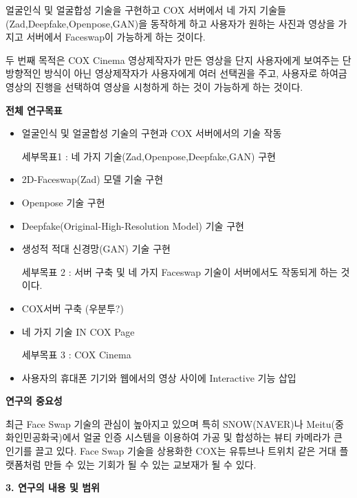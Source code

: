 \documentclass[chapter,oneside]{oblivoir}
\begin{document}
얼굴인식 및 얼굴합성 기술을 구현하고 COX 서버에서 네 가지 기술들(Zad,Deepfake,Openpose,GAN)을 동작하게 하고 사용자가 원하는 사진과 영상을 가지고 서버에서 Faceswap이 가능하게 하는 것이다. 

두 번째 목적은 COX Cinema 영상제작자가 만든 영상을 단지 사용자에게 보여주는 단방향적인 방식이 아닌 영상제작자가 사용자에게 여러 선택권을 주고, 사용자로 하여금 영상의 진행을 선택하여 영상을 시청하게 하는 것이 가능하게 하는 것이다. 

\textbf{전체 연구목표}

\begin{itemize}
    \item 얼굴인식 및 얼굴합성 기술의 구현과 COX 서버에서의 기술 작동

세부목표1 : 네 가지 기술(Zad,Openpose,Deepfake,GAN) 구현

\item 2D-Faceswap(Zad) 모델 기술 구현

\item Openpose 기술 구현

\item Deepfake(Original-High-Resolution Model) 기술 구현 

\item 생성적 적대 신경망(GAN) 기술 구현 

세부목표 2 : 서버 구축 및 네 가지 Faceswap 기술이 서버에서도 작동되게 하는 것이다.

\item COX서버 구축 (우분투?)

\item 네 가지 기술 IN COX Page

세부목표 3 : COX Cinema 

\item 사용자의 휴대폰 기기와 웹에서의 영상 사이에 Interactive 기능 삽입
    
\end{itemize}

\textbf{연구의 중요성}

최근 Face Swap 기술의 관심이 높아지고 있으며 특히 SNOW(NAVER)나 Meitu(중화인민공화국)에서 얼굴 인증 시스템을 이용하여 가공 및 합성하는 뷰티 카메라가 큰 인기를 끌고 있다. Face Swap 기술을 상용화한 COX는 유튜브나 트위치 같은 거대 플랫폼처럼 만들 수 있는 기회가 될 수 있는 교보재가 될 수 있다.

\vspace{1cm}

{ \Large\textbf{3. 연구의 내용 및 범위}  \par}
\vspace{0.5cm}
\end{document}
